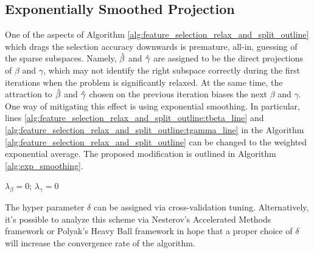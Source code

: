 \documentclass[11pt,letterpaper]{article}
\newcommand{\ouralgo}{R\&S-Mixed }
\numberwithin{equation}{section} %
\numberwithin{figure}{section} %
\numberwithin{table}{section} %
\begin{document}
\subsection{Exponentially Smoothed Projection}
One of the aspects of Algorithm \ref{alg:feature_selection_relax_and_split_outline} which drags the selection accuracy downwards is premature, all-in, guessing of the sparse subspaces. Namely, $\hat\beta$ and $\hat\gamma$ are assigned to be the direct projections of $\beta$ and $\gamma$, which may not identify the right subspace correctly during the first iterations when the problem is significantly relaxed. At the same time, the attraction to $\hat\beta$ and $\hat\gamma$ chosen on the previous iteration biases the next $\beta$ and $\gamma$. One way of mitigating this effect is using exponential smoothing. In particular, lines \ref{alg:feature_selection_relax_and_split_outline:tbeta_line} and \ref{alg:feature_selection_relax_and_split_outline:tgamma_line} in the Algorithm \ref{alg:feature_selection_relax_and_split_outline} can be changed to the weighted exponential average. The proposed modification is outlined in Algorithm \ref{alg:exp_smoothing}.

\begin{algorithm}
	$\lambda_\beta = 0$; $\lambda_\gamma = 0$ \\
	\BlankLine
\caption{\label{alg:exp_smoothing} A prospective version of \ouralgo with exponential smoothing for projected variables. This modification should increase accuracy of covariates selection.}	
\end{algorithm}

The hyper parameter $\delta$ can be assigned via cross-validation tuning. Alternatively, it's possible to analyze this scheme via Nesterov's Accelerated Methods framework \cite{Nesterov2004} or Polyak's Heavy Ball framework \cite{Polyak1964} in hope that a proper choice of $\delta$ will increase the convergence rate of the algorithm.
\end{document}
